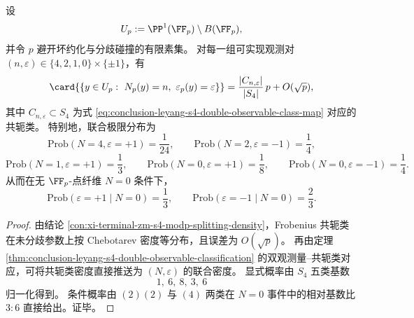 \begin{corollary}\label{cor:conclusion-leyang-s4-joint-chebotarev-double-observable}
设
\[
U_p:=\PP^1(\FF_p)\setminus B(\FF_p),
\]
并令 \(p\) 避开坏约化与分歧碰撞的有限素集。
对每一组可实现观测对 \((n,\varepsilon)\in\{4,2,1,0\}\times\{\pm1\}\)，有
\[
\card{\{y\in U_p:\ N_p(y)=n,\ \varepsilon_p(y)=\varepsilon\}}
=\frac{|C_{n,\varepsilon}|}{|S_4|}\,p+O(\sqrt p),
\]
其中 \(C_{n,\varepsilon}\subset S_4\) 为式 \eqref{eq:conclusion-leyang-s4-double-observable-class-map} 对应的共轭类。
特别地，联合极限分布为
\[
\mathrm{Prob}(N=4,\varepsilon=+1)=\frac1{24},\qquad
\mathrm{Prob}(N=2,\varepsilon=-1)=\frac14,
\]
\[
\mathrm{Prob}(N=1,\varepsilon=+1)=\frac13,\qquad
\mathrm{Prob}(N=0,\varepsilon=+1)=\frac18,\qquad
\mathrm{Prob}(N=0,\varepsilon=-1)=\frac14.
\]
从而在无 \(\FF_p\)-点纤维 \(N=0\) 条件下，
\[
\mathrm{Prob}(\varepsilon=+1\mid N=0)=\frac13,\qquad
\mathrm{Prob}(\varepsilon=-1\mid N=0)=\frac23.
\]
\end{corollary}
\begin{proof}
由结论 \ref{con:xi-terminal-zm-s4-modp-splitting-density}，Frobenius 共轭类在未分歧参数上按 Chebotarev 密度等分布，且误差为 \(O(\sqrt p)\)。
再由定理 \ref{thm:conclusion-leyang-s4-double-observable-classification} 的双观测量--共轭类对应，可将共轭类密度直接推送为 \((N,\varepsilon)\) 的联合密度。
显式概率由 \(S_4\) 五类基数
\[
1,\ 6,\ 8,\ 3,\ 6
\]
归一化得到。
条件概率由 \((2)(2)\) 与 \((4)\) 两类在 \(N=0\) 事件中的相对基数比 \(3:6\) 直接给出。证毕。
\end{proof}

